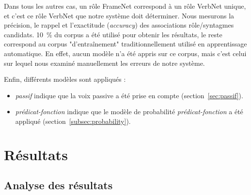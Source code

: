 Dans tous les autres cas, un rôle FrameNet correspond à un rôle VerbNet unique,
et c'est ce rôle VerbNet que notre système doit déterminer. Nous mesurons la
précision, le rappel et l'exactitude (\emph{accuracy}) des associations
rôle/syntagmes candidats. 10~\% du corpus a été utilisé pour obtenir les
résultats, le reste correspond au corpus "d'entraînement" traditionnellement
utilisé en apprentissage automatique. En effet, aucun modèle n'a été appris sur
ce corpus, mais c'est celui sur lequel nous examiné manuellement les erreurs de
notre système.

Enfin, différents modèles sont appliqués :

\begin{itemize}

    \item \emph{passif} indique que la voix passive a été prise en compte
    (section~\ref{sec:passif}).

    \item \emph{prédicat-fonction} indique que le modèle de probabilité
    \emph{prédicat-fonction} a été appliqué (section~\ref{subsec:probability}).

\end{itemize}

\section{Résultats}

\subsection{Analyse des résultats}

